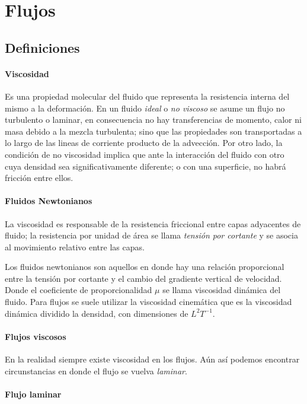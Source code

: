 \documentclass[openany,a4]{book}
\begin{document}
\chapter{Flujos}
\section{Definiciones}

\subsubsection{Viscosidad}

Es una propiedad molecular del fluido que representa la resistencia interna del mismo a la deformación. 
En un fluido \emph{ideal} o \emph{no viscoso} se asume un flujo 
no turbulento o laminar, en consecuencia no hay transferencias 
de momento, calor ni masa debido a la mezcla turbulenta; sino 
que las propiedades son transportadas a lo largo de las lineas 
de corriente producto de la advección. Por otro lado, la 
condición de no viscosidad implica que ante la interacción del 
fluido con otro cuya densidad sea significativamente diferente; 
o con una superficie, no habrá fricción entre ellos.

\subsubsection{Fluidos Newtonianos}
La viscosidad es responsable de la resistencia friccional entre capas adyacentes de fluido; la resistencia por unidad de área se llama \emph{tensión por cortante} y se asocia al movimiento relativo entre las capas.

Los fluidos newtonianos son aquellos en donde hay una relación 
proporcional entre la tensión por cortante y el cambio del 
gradiente vertical de velocidad. Donde el coeficiente de 
proporcionalidad $\mu$ se llama viscosidad dinámica del fluido. 
Para flujos se suele utilizar la viscosidad cinemática que es la 
viscosidad dinámica dividido la densidad, con dimensiones de 
$L^2 T^{-1}$.

\subsubsection{Flujos viscosos}

En la realidad siempre existe viscosidad en los flujos. Aún 
así podemos encontrar circunstancias en donde el flujo se 
vuelva \emph{laminar}.

\subsubsection{Flujo laminar}
\end{document}
